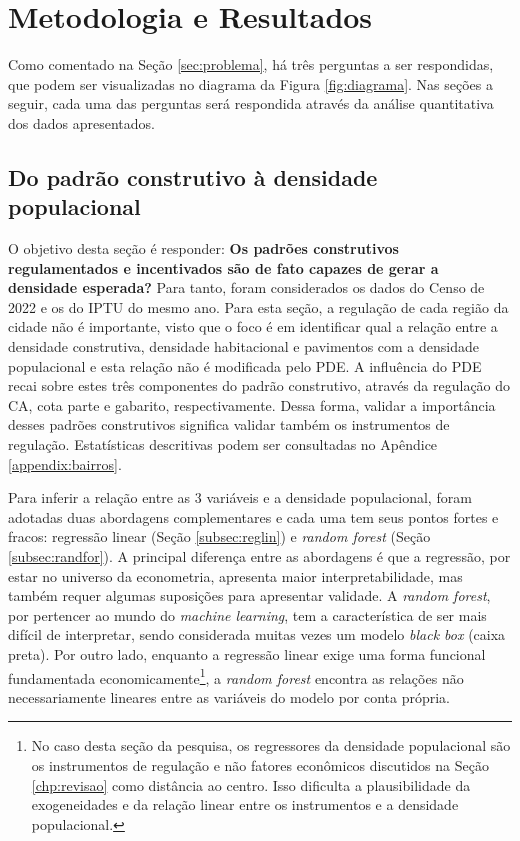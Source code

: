 \chapter{Metodologia e Resultados}
\label{chp:analise}

Como comentado na Seção \ref{sec:problema}, há três perguntas a ser respondidas, que podem ser visualizadas no diagrama da Figura \ref{fig:diagrama}. Nas seções a seguir, cada uma das perguntas será respondida através da análise quantitativa dos dados apresentados.


\section{Do padrão construtivo à densidade populacional}
\label{sec:perg1}


O objetivo desta seção é responder: \textbf{Os padrões construtivos regulamentados e incentivados são de fato capazes de gerar a densidade esperada?} Para tanto, foram considerados os dados do Censo de 2022 e os do IPTU do mesmo ano. Para esta seção, a regulação de cada região da cidade não é importante, visto que o foco é em identificar qual a relação entre a densidade construtiva, densidade habitacional e pavimentos com a densidade populacional e esta relação não é modificada pelo PDE. A influência do PDE recai sobre estes três componentes do padrão construtivo, através da regulação do CA, cota parte e gabarito, respectivamente. Dessa forma, validar a importância desses padrões construtivos significa validar também os instrumentos de regulação. Estatísticas descritivas podem ser consultadas no Apêndice \ref{appendix:bairros}.

Para inferir a relação entre as 3 variáveis e a densidade populacional, foram adotadas duas abordagens complementares e cada uma tem seus pontos fortes e fracos: regressão linear (Seção \ref{subsec:reglin}) e \textit{random forest} (Seção \ref{subsec:randfor}). A principal diferença entre as abordagens é que a regressão, por estar no universo da econometria, apresenta maior interpretabilidade, mas também requer algumas suposições para apresentar validade. A \textit{random forest}, por pertencer ao mundo do \textit{machine learning}, tem a característica de ser mais difícil de interpretar, sendo considerada muitas vezes um modelo \textit{black box} (caixa preta). Por outro lado, enquanto a regressão linear exige uma forma funcional fundamentada economicamente\footnote{No caso desta seção da pesquisa, os regressores da densidade populacional são os instrumentos de regulação e não fatores econômicos discutidos na Seção \ref{chp:revisao} como distância ao centro. Isso dificulta a plausibilidade da exogeneidades e da relação linear entre os instrumentos e a densidade populacional.}, a \textit{random forest} encontra as relações não necessariamente lineares entre as variáveis do modelo por conta própria. 


